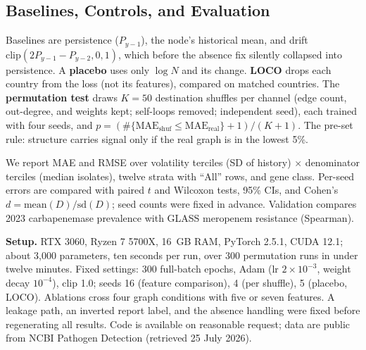 \documentclass[journal]{IEEEtran}
\begin{document}
\subsection{Baselines, Controls, and Evaluation}
Baselines are persistence ($P_{y-1}$), the node's historical mean, and drift $\text{clip}(2P_{y-1} - P_{y-2}, 0, 1)$, which before the absence fix silently collapsed into persistence. A \textbf{placebo} uses only $\log N$ and its change. \textbf{LOCO} drops each country from the loss (not its features), compared on matched countries. The \textbf{permutation test} draws $K=50$ destination shuffles per channel (edge count, out-degree, and weights kept; self-loops removed; independent seed), each trained with four seeds, and $p = (\#\{\text{MAE}_{\text{shuf}} \le \text{MAE}_{\text{real}}\}+1)/(K+1)$. The pre-set rule: structure carries signal only if the real graph is in the lowest 5\%.

We report MAE and RMSE over volatility terciles (SD of history) $\times$ denominator terciles (median isolates), twelve strata with ``All'' rows, and gene class. Per-seed errors are compared with paired $t$ and Wilcoxon tests, 95\% CIs, and Cohen's $d = \text{mean}(D)/\text{sd}(D)$; seed counts were fixed in advance. Validation compares 2023 carbapenemase prevalence with GLASS meropenem resistance (Spearman).

\textbf{Setup.} RTX 3060, Ryzen 7 5700X, 16~GB RAM, PyTorch 2.5.1, CUDA 12.1; about 3,000 parameters, ten seconds per run, over 300 permutation runs in under twelve minutes. Fixed settings: 300 full-batch epochs, Adam (lr $2\times10^{-3}$, weight decay $10^{-4}$), clip 1.0; seeds 16 (feature comparison), 4 (per shuffle), 5 (placebo, LOCO). Ablations cross four graph conditions with five or seven features. A leakage path, an inverted report label, and the absence handling were fixed before regenerating all results. Code is available on reasonable request; data are public from NCBI Pathogen Detection (retrieved 25 July 2026).
\end{document}
